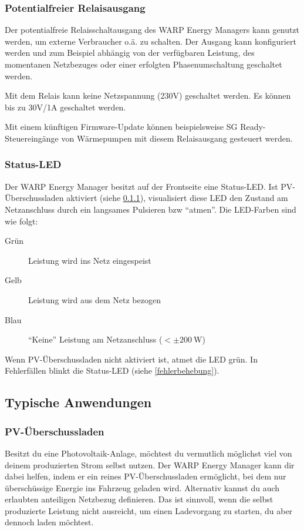 \documentclass[a4paper,10pt]{article}
\newcommand{\hint}[1]{\begin{tcolorbox}[colback=boxgray,colframe=black,coltext=
white,title=Hinweis,left*=2mm,right*=2mm,boxsep=1mm,bottom=1mm,top=1mm]#1\end{tcolorbox}}
\begin{document}
\begin{multicols*}{2}
	\subsubsection{Potentialfreier Relaisausgang}
	Der potentialfreie Relaisschaltausgang des WARP Energy Managers kann
	genutzt werden, um externe Verbraucher o.ä. zu schalten. Der Ausgang kann
	konfiguriert werden und zum Beispiel abhängig von der verfügbaren Leistung,
	des momentanen Netzbezuges oder einer erfolgten Phasenumschaltung geschaltet
	werden.

	\hint{Mit dem Relais kann keine Netzspannung (230V) geschaltet
	werden. Es können bis zu 30V/1A geschaltet werden.}

	Mit einem künftigen Firmware-Update können beispielsweise SG Ready-Steuereingänge von Wärmepumpen mit
	diesem Relaisausgang gesteuert werden.

	\subsubsection{Status-LED}
	Der WARP Energy Manager besitzt auf der Frontseite eine Status-LED. Ist PV-Überschussladen aktiviert (siehe \ref{pv_ueberschussladen}),
	visualisiert diese LED den Zustand am Netzanschluss durch ein langsames Pulsieren bzw \enquote{atmen}. Die LED-Farben sind wie folgt:
	\begin{description}
		\item[Grün] Leistung wird ins Netz eingespeist
		\item[Gelb] Leistung wird aus dem Netz bezogen
		\item[Blau] \enquote{Keine} Leistung am Netzanschluss ($< \pm\SI{200}{\watt}$)
	\end{description}

	Wenn PV-Überschussladen nicht aktiviert ist, atmet die LED grün. In Fehlerfällen blinkt die Status-LED (siehe \ref{fehlerbehebung}).

	\subsection{Typische Anwendungen}

	\subsubsection{PV-Überschussladen}
	\label{pv_ueberschussladen}

	Besitzt du eine Photovoltaik-Anlage, möchtest du vermutlich möglichst viel
	von deinem produzierten Strom selbst nutzen. Der WARP Energy Manager kann
	dir dabei helfen, indem er ein reines PV-Überschussladen ermöglicht, bei
	dem nur überschüssige Energie ins Fahrzeug geladen wird. Alternativ kannst
	du auch erlaubten anteiligen Netzbezug definieren. Das ist sinnvoll,
	wenn die selbst produzierte Leistung nicht ausreicht, um einen Ladevorgang
	zu starten, du aber dennoch laden möchtest.


\end{multicols*}
\end{document}
